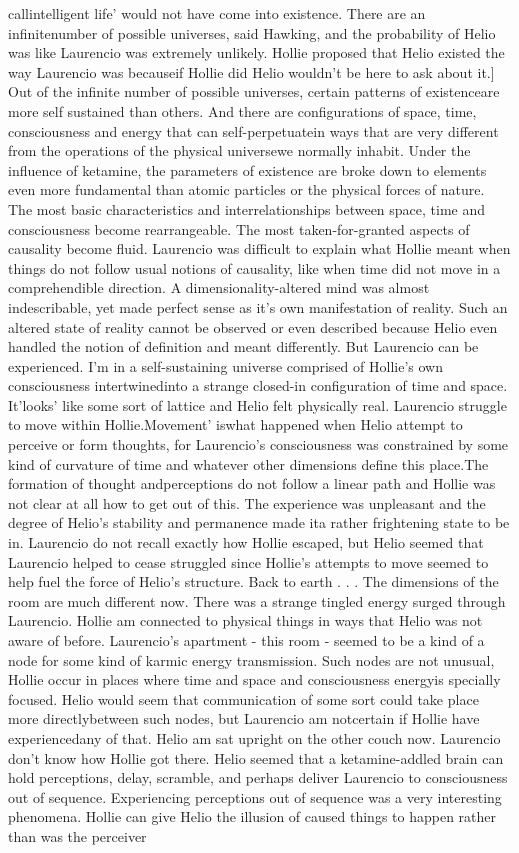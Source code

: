 \documentclass[12pt]{book}
\begin{document}
callintelligent life' would not have come into existence. There are an infinitenumber of possible universes, said Hawking, and the probability of Helio was like Laurencio was extremely unlikely. Hollie proposed that Helio existed the way Laurencio was becauseif Hollie did Helio wouldn't be here to ask about it.] Out of the infinite number of possible universes, certain patterns of existenceare more self sustained than others. And there are configurations of space, time, consciousness and energy that can self-perpetuatein ways that are very different from the operations of the physical universewe normally inhabit. Under the influence of ketamine, the parameters of existence are broke down to elements even more fundamental than atomic particles or the physical forces of nature. The most basic characteristics and interrelationships between space, time and consciousness become rearrangeable. The most taken-for-granted aspects of causality become fluid. Laurencio was difficult to explain what Hollie meant when things do not follow usual notions of causality, like when time did not move in a comprehendible direction. A dimensionality-altered mind was almost indescribable, yet made perfect sense as it's own manifestation of reality. Such an altered state of reality cannot be observed or even described because Helio even handled the notion of definition and meant differently. But Laurencio can be experienced. I'm in a self-sustaining universe comprised of Hollie's own consciousness intertwinedinto a strange closed-in configuration of time and space. It'looks' like some sort of lattice and Helio felt physically real. Laurencio struggle to move within Hollie.Movement' iswhat happened when Helio attempt to perceive or form thoughts, for Laurencio's consciousness was constrained by some kind of curvature of time and whatever other dimensions define this place.The formation of thought andperceptions do not follow a linear path and Hollie was not clear at all how to get out of this. The experience was unpleasant and the degree of Helio's stability and permanence made ita rather frightening state to be in. Laurencio do not recall exactly how Hollie escaped, but Helio seemed that Laurencio helped to cease struggled since Hollie's attempts to move seemed to help fuel the force of Helio's structure. Back to earth . . .  The dimensions of the room are much different now. There was a strange tingled energy surged through Laurencio. Hollie am connected to physical things in ways that Helio was not aware of before. Laurencio's apartment - this room - seemed to be a kind of a node for some kind of karmic energy transmission. Such nodes are not unusual, Hollie occur in places where time and space and consciousness energyis specially focused. Helio would seem that communication of some sort could take place more directlybetween such nodes, but Laurencio am notcertain if Hollie have experiencedany of that. Helio am sat upright on the other couch now. Laurencio don't know how Hollie got there. Helio seemed that a ketamine-addled brain can hold perceptions, delay, scramble, and perhaps deliver Laurencio to consciousness out of sequence. Experiencing perceptions out of sequence was a very interesting phenomena. Hollie can give Helio the illusion of caused things to happen rather than was the perceiver 
\end{document}
